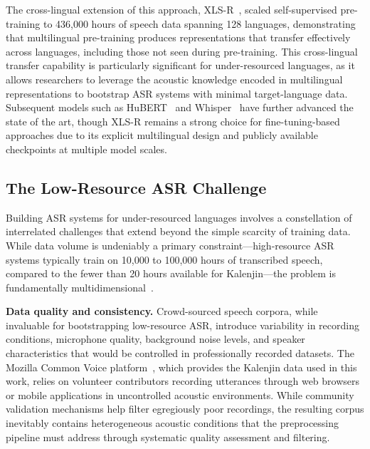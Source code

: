 \documentclass[journal]{IEEEtran}
\begin{document}
The cross-lingual extension of this approach, XLS-R~\cite{babu2022xls}, scaled self-supervised pre-training to 436,000 hours of speech data spanning 128 languages, demonstrating that multilingual pre-training produces representations that transfer effectively across languages, including those not seen during pre-training. This cross-lingual transfer capability is particularly significant for under-resourced languages, as it allows researchers to leverage the acoustic knowledge encoded in multilingual representations to bootstrap ASR systems with minimal target-language data. Subsequent models such as HuBERT~\cite{hsu2021hubert} and Whisper~\cite{radford2023robust} have further advanced the state of the art, though XLS-R remains a strong choice for fine-tuning-based approaches due to its explicit multilingual design and publicly available checkpoints at multiple model scales.

\subsection{The Low-Resource ASR Challenge}

Building ASR systems for under-resourced languages involves a constellation of interrelated challenges that extend beyond the simple scarcity of training data. While data volume is undeniably a primary constraint---high-resource ASR systems typically train on 10,000 to 100,000 hours of transcribed speech, compared to the fewer than 20 hours available for Kalenjin---the problem is fundamentally multidimensional~\cite{besacier2014automatic}.

\textbf{Data quality and consistency.} Crowd-sourced speech corpora, while invaluable for bootstrapping low-resource ASR, introduce variability in recording conditions, microphone quality, background noise levels, and speaker characteristics that would be controlled in professionally recorded datasets. The Mozilla Common Voice platform~\cite{ardila2020common}, which provides the Kalenjin data used in this work, relies on volunteer contributors recording utterances through web browsers or mobile applications in uncontrolled acoustic environments. While community validation mechanisms help filter egregiously poor recordings, the resulting corpus inevitably contains heterogeneous acoustic conditions that the preprocessing pipeline must address through systematic quality assessment and filtering.
\end{document}

